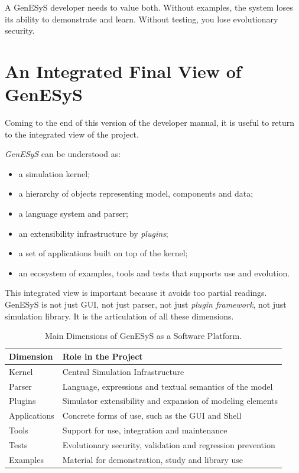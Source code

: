 A GenESyS developer needs to value both. Without examples, the system loses its ability to demonstrate and learn. Without testing, you lose evolutionary security.

\section{An Integrated Final View of GenESyS}
\label{sec:cap10_visao_final_integrada_genesys}

Coming to the end of this version of the developer manual, it is useful to return to the integrated view of the project.

\textit{GenESyS} can be understood as:

\begin{itemize}
 \item a simulation kernel;
 \item a hierarchy of objects representing model, components and data;
 \item a language system and parser;
 \item an extensibility infrastructure by \textit{plugins};
 \item a set of applications built on top of the kernel;
 \item an ecosystem of examples, tools and tests that supports use and evolution.
\end{itemize}

This integrated view is important because it avoids too partial readings. GenESyS is not just GUI, not just parser, not just \textit{plugin framework}, not just simulation library. It is the articulation of all these dimensions.

\begin{table}[htbp]
 \centering
 \caption{Main Dimensions of GenESyS as a Software Platform.}
 \label{tab:cap10_dimensoes_principais_genesys}
 \small
 \begin{tabular}{|p{3.4cm}|p{6.9cm}|}
 \hline
 \textbf{Dimension} & \textbf{Role in the Project} \\
 \hline
 Kernel & Central Simulation Infrastructure \\
 \hline
 Parser & Language, expressions and textual semantics of the model \\
 \hline
 Plugins & Simulator extensibility and expansion of modeling elements \\
 \hline
 Applications & Concrete forms of use, such as the GUI and Shell \\
 \hline
 Tools & Support for use, integration and maintenance \\
 \hline
 Tests & Evolutionary security, validation and regression prevention \\
 \hline
 Examples & Material for demonstration, study and library use \\
 \hline
 \end{tabular}
\end{table}

